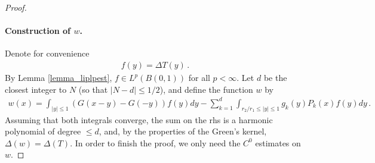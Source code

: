 \documentclass[11pt]{article}
\begin{document}
\begin{proof}
\paragraph{Construction of $w$.}
Denote for convenience
\begin{gather}
 f(y)=\Delta T(y)\, .
\end{gather}
By Lemma \ref{lemma_liplpest}, $f\in L^p(B(0,1))$ for all $p<\infty$. Let $d$ be the closest integer to $N$ (so that ${\left|{N-d}\right|}\leq 1/2$), and define the function $w$ by
\begin{gather}
 w(x) = \int_{{\left|y\right|} \leq 1} {\left({G(x-y)-G(-y)}\right)} f(y)dy- \sum_{k=1}^d \int_{r_2/r_1\leq{\left|y\right|} \leq 1} g_k(y) P_k(x) f(y)dy\, .
\end{gather}
Assuming that both integrals converge, the sum on the rhs is a harmonic polynomial of degree $\leq d$, and, by the properties of the Green's kernel, $\Delta (w) = \Delta (T)$. In order to finish the proof, we only need the $C^0$ estimates on $w$.


\end{proof}
\end{document}
